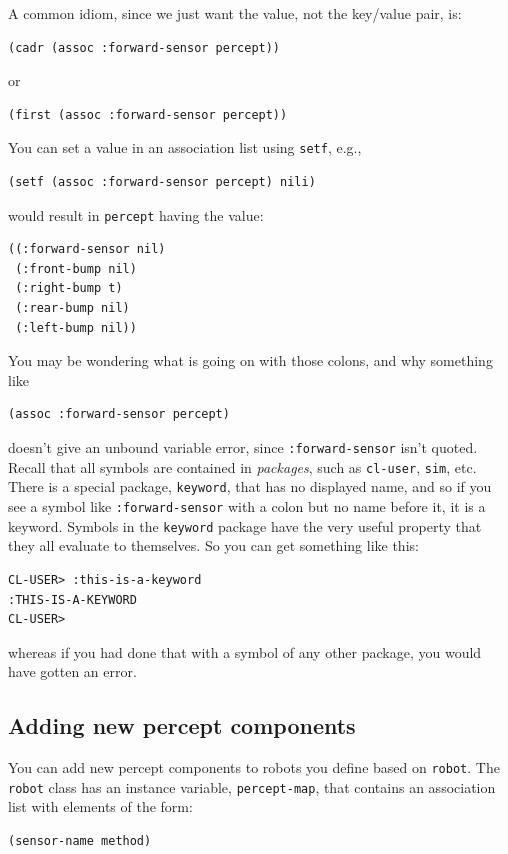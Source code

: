 \documentclass[11pt]{tufte-handout}
\begin{document}
\noindent A common idiom, since we just want the value, not the key/value pair, is:
\begin{verbatim}
(cadr (assoc :forward-sensor percept))
\end{verbatim}

\noindent or
\begin{verbatim}
(first (assoc :forward-sensor percept))
\end{verbatim}

\noindent You can set a value in an association list using \texttt{setf}, e.g.,
\begin{verbatim}
(setf (assoc :forward-sensor percept) nili)
\end{verbatim}

\noindent would result in \texttt{percept} having  the value:
\begin{verbatim}
((:forward-sensor nil)
 (:front-bump nil)
 (:right-bump t)
 (:rear-bump nil)
 (:left-bump nil))
\end{verbatim}


You may be wondering what is going on with those colons, and why something like
\begin{verbatim}
(assoc :forward-sensor percept)
\end{verbatim}

\noindent doesn't give an unbound variable error, since \texttt{:forward-sensor} isn't quoted.  Recall that all symbols are contained in \emph{packages}, such as \texttt{cl-user}, \texttt{sim}, etc.  There is a special package, \texttt{keyword}, that has no displayed name, and so if you see a symbol like \texttt{:forward-sensor} with a colon but no name before it, it is a keyword.  Symbols in the \texttt{keyword} package have the very useful property that they all evaluate to themselves.  So you can get something like this:
\begin{verbatim}
CL-USER> :this-is-a-keyword
:THIS-IS-A-KEYWORD
CL-USER>
\end{verbatim}

\noindent whereas if you had done that with a symbol of any other package, you would have gotten an error.

\subsection{Adding new percept components}
\label{sec:orgef868e9}
\label{orge6509b9}

You can add new percept components to robots you define based on \texttt{robot}.  The \texttt{robot} class has an instance variable, \texttt{percept-map}, that contains an association list with elements of the form:
\begin{verbatim}
(sensor-name method)
\end{verbatim}
\end{document}
